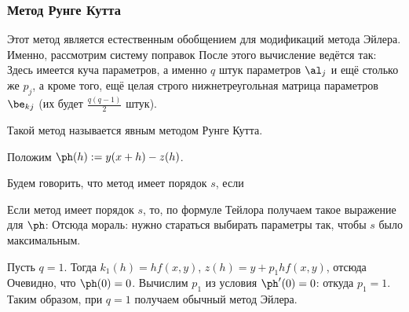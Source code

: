 \documentclass[a4paper]{article}
\begin{document}
\subsubsection{Метод Рунге Кутта}

Этот метод является естественным обобщением для модификаций метода
Эйлера.  Именно, рассмотрим систему поправок 
После этого вычисление ведётся так:   Здесь имеется куча параметров, а
именно $q$ штук параметров $\al_j$ и ещё столько же $p_j$, а кроме
того, ещё целая строго нижнетреугольная матрица параметров $\be_{kj}$
(их будет $\frac{q(q-1)}{2}$ штук).

\begin{df}
Такой метод называется явным методом Рунге Кутта.
\end{df}


Положим $\ph(h) := y(x+h) - z(h)$.

\begin{df}
Будем говорить, что метод имеет порядок $s$, если 
\end{df}

Если метод имеет порядок $s$, то, по формуле Тейлора получаем такое
выражение для $\ph$:   Отсюда мораль: нужно стараться выбирать
параметры так, чтобы $s$ было максимальным.

\begin{ex}
Пусть $q = 1$. Тогда $k_1(h) = h f(x,y)$, $z(h) = y + p_1 hf(x,y)$,
отсюда   Очевидно, что
$\ph(0) = 0$. Вычислим $p_1$ из условия $\ph'(0) = 0$:  откуда $p_1 = 1$.
Таким образом, при $q = 1$ получаем обычный метод Эйлера.
\end{ex}
\end{document}
